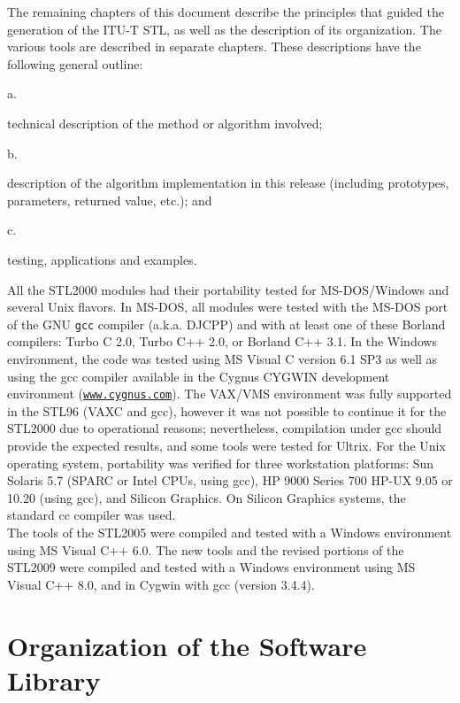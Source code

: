 The remaining chapters of this document describe the principles that
guided the generation of the ITU-T STL, as well as the description of its
organization. The various tools are described in separate chapters. These
descriptions have the following general outline:

 a. \parbox[t]{140mm}{
               technical description of the method or algorithm involved;}

 b. \parbox[t]{140mm}{
               description of the algorithm implementation in this
               release (including prototypes, parameters, returned value,
               etc.); and }

 c. \parbox[t]{140mm}{
               testing, applications and examples.}

All the STL2000 modules had their portability tested for
MS-DOS/Windows and several Unix flavors. In MS-DOS, all modules were
tested with the MS-DOS port of the GNU {\tt gcc} compiler (a.k.a.
DJCPP) and with at least one of these Borland compilers: Turbo C
2.0, Turbo C++ 2.0, or Borland C++ 3.1. In the Windows environment,
the code was tested using MS Visual C version 6.1 SP3 as well as
using the gcc compiler available in the Cygnus CYGWIN development
environment ({\tt \url{www.cygnus.com}}). The VAX/VMS environment
was fully supported in the STL96 (VAXC and gcc), however it was not
possible to continue it for the STL2000 due to operational reasons;
nevertheless, compilation under gcc should provide the expected
results, and some tools were tested for Ultrix. For the Unix
operating system, portability was verified for three workstation
platforms: Sun Solaris 5.7 (SPARC or Intel CPUs, using gcc), HP 9000
Series 700 HP-UX 9.05 or 10.20 (using gcc), and Silicon Graphics. On
Silicon Graphics
systems, the standard cc compiler was used. \\
The tools of the STL2005 were compiled and tested with a Windows 
environment using MS Visual C++ 6.0.
The new tools and the revised portions of the STL2009 were compiled and tested with a
Windows environment using MS Visual C++ 8.0, and in Cygwin with gcc
(version 3.4.4).

\section{Organization of the Software Library}

